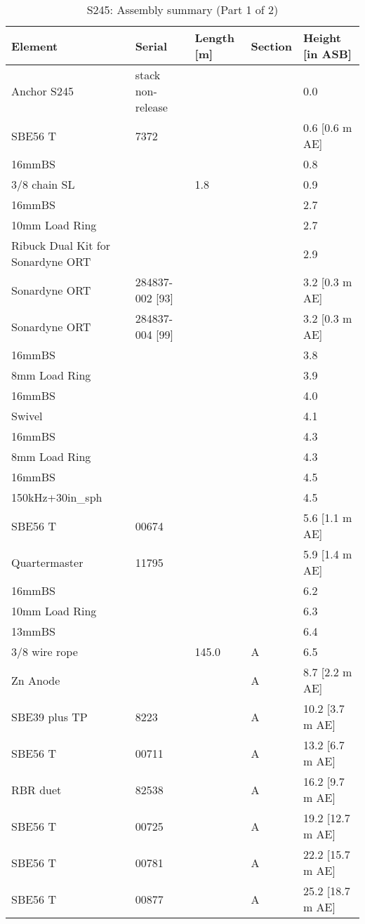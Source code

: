 \documentclass{article}
\begin{document}
\begin{table}[!htbp]
\centering
\caption{S245: Assembly summary (Part 1 of 2)}
\begin{tabular}{lllll}
\toprule
Element & Serial & Length [m] & Section & Height [in ASB] \\
\midrule
Anchor S245 & stack non-release &  &  & 0.0 \\
SBE56 T & 7372 &  &  & 0.6 [0.6 m AE] \\
16mmBS &  &  &  & 0.8 \\
3/8 chain SL &  & 1.8 &  & 0.9 \\
16mmBS &  &  &  & 2.7 \\
10mm Load Ring &  &  &  & 2.7 \\
Ribuck Dual Kit for Sonardyne ORT &  &  &  & 2.9 \\
Sonardyne ORT & 284837-002 [93] &  &  & 3.2 [0.3 m AE] \\
Sonardyne ORT & 284837-004 [99] &  &  & 3.2 [0.3 m AE] \\
16mmBS &  &  &  & 3.8 \\
8mm Load Ring &  &  &  & 3.9 \\
16mmBS &  &  &  & 4.0 \\
Swivel &  &  &  & 4.1 \\
16mmBS &  &  &  & 4.3 \\
8mm Load Ring &  &  &  & 4.3 \\
16mmBS &  &  &  & 4.5 \\
150kHz+30in\_sph &  &  &  & 4.5 \\
SBE56 T & 00674 &  &  & 5.6 [1.1 m AE] \\
Quartermaster & 11795 &  &  & 5.9 [1.4 m AE] \\
16mmBS &  &  &  & 6.2 \\
10mm Load Ring &  &  &  & 6.3 \\
13mmBS &  &  &  & 6.4 \\
3/8 wire rope &  & 145.0 & A & 6.5 \\
Zn Anode &  &  & A & 8.7 [2.2 m AE] \\
SBE39 plus TP & 8223 &  & A & 10.2 [3.7 m AE] \\
SBE56 T & 00711 &  & A & 13.2 [6.7 m AE] \\
RBR duet & 82538 &  & A & 16.2 [9.7 m AE] \\
SBE56 T & 00725 &  & A & 19.2 [12.7 m AE] \\
SBE56 T & 00781 &  & A & 22.2 [15.7 m AE] \\
SBE56 T & 00877 &  & A & 25.2 [18.7 m AE] \\

\end{tabular}
\end{table}
\end{document}
